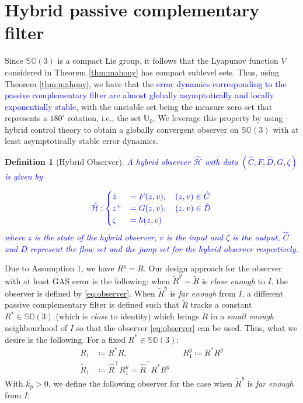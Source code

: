 \documentclass{article}
\newcommand{\SOthree}{\mathbb{SO}(3)}
\newtheorem{definition}{Definition}
\newcommand{\textblue}[1]{\textcolor{blue}{#1}}
\newcommand{\Rtilde}{\tilde{R}}
\newcommand{\Rstar}{{R^*}}
\begin{document}

\section{Hybrid passive complementary filter}

{Since $\SOthree$ is a compact Lie group, it follows that the Lyapunov function $V$ considered in Theorem \ref{thm:mahony} has compact sublevel sets.} Thus, using Theorem \ref{thm:mahony}, we have that the \textblue{error dynamics corresponding to the passive complementary filter are almost globally asymptotically and locally exponentially stable}, with the unstable set being the measure zero set that represents a $180^\circ$ rotation, i.e., the set $\mathbb{U}_0$. We leverage this property by using hybrid control theory to obtain a globally convergent observer on $\SOthree$ with at least asymptotically stable error dynamics. 

\begin{definition}[Hybrid Observer]
    \textblue{A hybrid observer $\hat{\mathcal{H}}$ with data $(\hat{C}, F, \hat{D}, G, \zeta)$ is given by}

\begin{alignat}{3}
    \textblue{\hat{\mathcal{H}} :  \begin{cases}
        \dot{z} &= F(z, v), \quad (z, v) \in \hat{C}\\
        z^+ &= G(z, v), \quad (z, v)\in \hat{D}\\
        \zeta &= h(z, v)
    \end{cases}}
\end{alignat}
\textblue{where $z$ is the state of the hybrid observer, $v$ is the input and $\zeta$ is the output, $\hat{C}$ and $\hat{D}$ represent the flow set and the jump set for the hybrid observer respectively. }
\end{definition}

Due to Assumption 1, we have $R^y = R$. Our design approach for the observer with at least GAS error is the following: when {$\Rtilde^y = \Rtilde$} is \emph{close enough} to $I$, the observer is defined by \eqref{eq:observer}. When ${\Rtilde^y}$ is \emph{far enough} from $I$, a different passive complementary filter is defined such that $\Rtilde$ tracks a constant $\Rstar\in\SOthree$ (which is \emph{close} to identity) which brings $\Rtilde$ in a \emph{small enough} neighbourhood of $I$ so that the observer \eqref{eq:observer} can be used. Thus, what we desire is the following. For a fixed $\Rstar\in \SOthree$:
\begin{subequations}
\begin{align}
    R_1 &\coloneqq \Rstar R, && R_1^y \coloneqq \Rstar R^y\\
    \Rtilde_1 &\coloneqq \hat{R}^\top R^y_1 = \hat{R}^\top \Rstar R^y
\end{align}
\end{subequations}
With $\overline{k_p}>0$, we define the following observer for the case when $\Rtilde^y$ is \emph{far enough} from $I$. 
\end{document}
